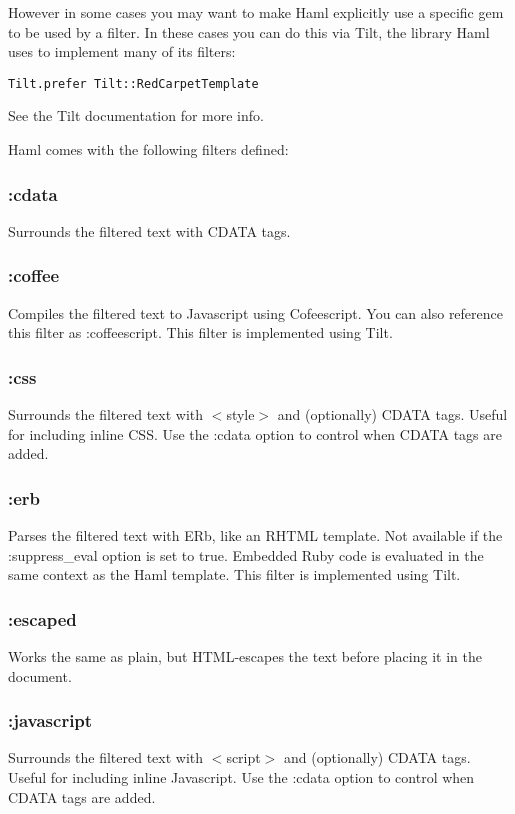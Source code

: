 \documentclass[10pt]{article}
\begin{document}
 However in some cases you may want to make Haml explicitly use a specific gem to be used by a filter. In these cases you can do this via Tilt, the library Haml uses to implement many of its filters:
\begin{verbatim}
Tilt.prefer Tilt::RedCarpetTemplate
\end{verbatim}


 See the Tilt documentation for more info.


 Haml comes with the following filters defined:
\subsubsection*{:cdata}


 Surrounds the filtered text with CDATA tags.
\subsubsection*{:coffee}


 Compiles the filtered text to Javascript using Cofeescript. You can also reference this filter as :coffeescript. This filter is implemented using Tilt.
\subsubsection*{:css}


 Surrounds the filtered text with $<$style$>$ and (optionally) CDATA tags. Useful for including inline CSS. Use the :cdata option to control when CDATA tags are added.
\subsubsection*{:erb}


 Parses the filtered text with ERb, like an RHTML template. Not available if the :suppress\_eval option is set to true. Embedded Ruby code is evaluated in the same context as the Haml template. This filter is implemented using Tilt.
\subsubsection*{:escaped}


 Works the same as plain, but HTML-escapes the text before placing it in the document.
\subsubsection*{:javascript}


 Surrounds the filtered text with $<$script$>$ and (optionally) CDATA tags. Useful for including inline Javascript. Use the :cdata option to control when CDATA tags are added.
\end{document}
